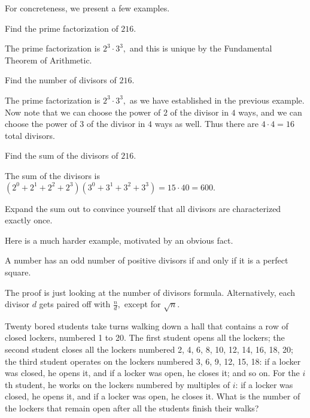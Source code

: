 \documentclass[mast]{lucky}
\begin{document}
For concreteness, we present a few examples.
\begin{exam}
Find the prime factorization of $216.$
\end{exam}
\begin{sol}
The prime factorization is $2^3\cdot 3^3,$ and this is unique by the Fundamental Theorem of Arithmetic.
\end{sol}
\begin{exam}
Find the number of divisors of $216.$
\end{exam}
\begin{sol}
The prime factorization is $2^3\cdot 3^3,$ as we have established in the previous example. Now note that we can choose the power of $2$ of the divisor in $4$ ways, and we can choose the power of $3$ of the divisor in $4$ ways as well. Thus there are $4\cdot 4=16$ total divisors.
\end{sol}
\begin{exam}
Find the sum of the divisors of $216.$
\end{exam}
\begin{sol}
The sum of the divisors is $(2^0+2^1+2^2+2^3)(3^0+3^1+3^2+3^3)=15\cdot 40=600.$

Expand the sum out to convince yourself that all divisors are characterized exactly once.
\end{sol}
Here is a much harder example, motivated by an obvious fact.
\begin{fact}
A number has an odd number of positive divisors if and only if it is a perfect square.
\end{fact}
The proof is just looking at the number of divisors formula. Alternatively, each divisor $d$ gets paired off with $\frac{n}{d},$ except for $\sqrt{n}.$

\begin{exam}[104 NT]
Twenty bored students take turns walking down a hall that contains a row of closed lockers, numbered 1 to 20. The first student opens all the lockers; the second student closes all the lockers numbered 2, 4, 6, 8, 10, 12, 14, 16, 18, 20; the third student operates on the lockers numbered 3, 6, 9, 12, 15, 18: if a locker was closed, he opens it, and if a locker was open, he closes it; and so on. For the $i$th student, he works on the lockers numbered by multiples of $i$: if a locker was closed, he opens it, and if a locker was open, he closes it. What is the number of the lockers that remain open after all the students finish their walks?
\end{exam}
\end{document}

